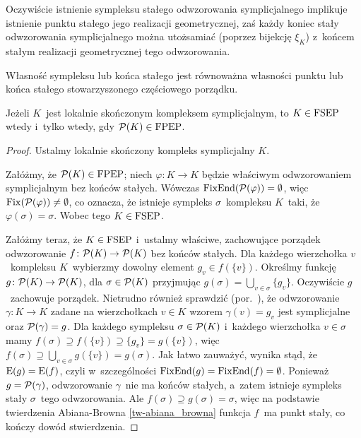 Oczywiście istnienie sympleksu stałego odwzorowania symplicjalnego implikuje istnienie punktu stałego jego realizacji geometrycznej, zaś każdy koniec stały odwzorowania symplicjalnego można utożsamiać (poprzez bijekcję $\xi_K$) z~końcem stałym realizacji geometrycznej tego odwzorowania.

Własność sympleksu lub końca stałego jest równoważna własności punktu lub końca stałego stowarzyszonego częściowego porządku.

\begin{stw}\label{stw-simplicial_fpep_wtw_order_theoretic}
Jeżeli $K$~jest lokalnie skończonym kompleksem symplicjalnym, to $K\in\mathrm{FSEP}$ wtedy i~tylko wtedy, gdy $\mathcal{P}(K)\in\mathrm{FPEP}$.
\end{stw}
\begin{proof}
Ustalmy lokalnie skończony kompleks symplicjalny $K$. 

Załóżmy, że $\mathcal{P}(K)\in\mathrm{FPEP}$; niech $\varphi\colon K\to K$ będzie właściwym odwzorowaniem symplicjalnym bez końców stałych. Wówczas $\operatorname{FixEnd}(\mathcal{P}(\varphi))=\emptyset$, więc $\operatorname{Fix}(\mathcal{P}(\varphi))\not=\emptyset$, co oznacza, że istnieje sympleks $\sigma$~kompleksu $K$~taki, że $\varphi(\sigma)=\sigma$. Wobec tego $K\in\mathrm{FSEP}$.

Załóżmy teraz, że $K\in\mathrm{FSEP}$ i~ustalmy właściwe, zachowujące porządek odwzorowanie $f\colon \mathcal{P}(K)\to \mathcal{P}(K)$ bez końców stałych. Dla każdego wierzchołka $v$~kompleksu $K$~wybierzmy dowolny element $g_v\in f(\{v\})$. Określmy funkcję $g\colon \mathcal{P}(K)\to \mathcal{P}(K)$, dla $\sigma\in \mathcal{P}(K)$ przyjmując $g(\sigma)=\bigcup_{v\in\sigma}\{g_v\}$. Oczywiście $g$~zachowuje porządek. Nietrudno również sprawdzić (por.~\cite[Lemma 6.3.14]{Schroder03}), że odwzorowanie $\gamma\colon K\to K$ zadane na wierzchołkach $v\in K$ wzorem $\gamma(v)=g_v$ jest symplicjalne oraz $\mathcal{P}(\gamma)=g$. Dla każdego sympleksu $\sigma\in \mathcal{P}(K)$ i~każdego wierzchołka $v\in\sigma$ mamy $f(\sigma)\supseteq f(\{v\})\supseteq \{g_v\}= g(\{v\})$, więc $f(\sigma)\supseteq\bigcup_{v\in \sigma} g(\{v\})=g(\sigma)$. Jak łatwo zauważyć, wynika stąd, że $\mathrm{E}(g)=\mathrm{E}(f)$, czyli w~szczególności $\operatorname{FixEnd}(g)=\operatorname{FixEnd}(f)=\emptyset$. Ponieważ $g=\mathcal{P}(\gamma)$, odwzorowanie $\gamma$~nie ma końców stałych, a~zatem istnieje sympleks stały $\sigma$~tego odwzorowania. Ale $f(\sigma)\supseteq g(\sigma)=\sigma$, więc na podstawie twierdzenia Abiana-Browna \ref{tw-abiana_browna} funkcja $f$~ma punkt stały, co kończy dowód stwierdzenia.
\end{proof}



